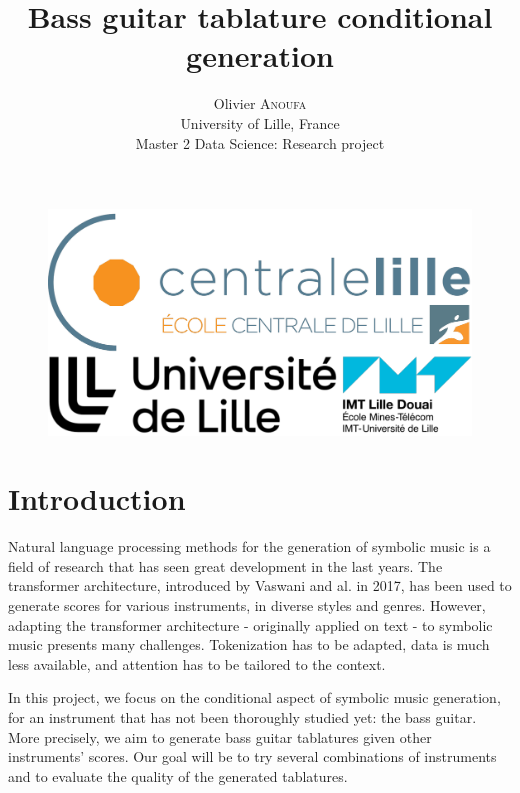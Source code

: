 \documentclass[11pt, a4paper]{article}
\begin{document}
% 

\begin{figure}[t]%
    \centering
    \includegraphics[width=.5\linewidth]{logos_empile}
\end{figure}

\title{Bass guitar tablature conditional generation}

\author{Olivier \textsc{Anoufa} \\  University of Lille, France \\ Master 2 Data Science: Research project}

{\let\newpage\relax\maketitle}

\newpage

\section*{Introduction}

Natural language processing methods for the generation of symbolic music is a field of research that has seen great development in the last years.
The transformer architecture, introduced by Vaswani and al. in 2017, has been used to generate scores for various instruments, in diverse styles and genres\cite{vaswaniAttentionAllYou2023, leNaturalLanguageProcessing2024}.
However, adapting the transformer architecture - originally applied on text - to symbolic music presents many challenges.
Tokenization has to be adapted, data is much less available, and attention has to be tailored to the context\cite{leNaturalLanguageProcessing2024}.


In this project, we focus on the conditional aspect of symbolic music generation, for an instrument that has not been thoroughly studied yet: the bass guitar.
More precisely, we aim to generate bass guitar tablatures given other instruments' scores. Our goal will be to try several combinations of instruments and to evaluate the quality of the generated tablatures.
\end{document}
